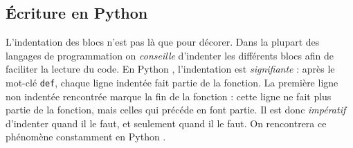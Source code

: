 \subsection{\'Ecriture en Python }


\begin{rem}
 L'indentation des blocs n'est pas là que pour décorer. Dans la plupart des langages de 
programmation on \emph{conseille} d'indenter les différents blocs afin de faciliter la lecture du 
code. En Python , l'indentation est \emph{signifiante} : après le mot-clé \texttt{def}, chaque 
ligne indentée fait partie de la fonction. La première ligne non indentée rencontrée marque la 
fin de la fonction : cette ligne ne fait plus partie de la fonction, mais celles qui précéde en 
font partie. Il est donc \emph{impératif} d'indenter quand il le faut, et seulement 
quand il le faut. On rencontrera ce phénomène constamment en Python .
\end{rem}

